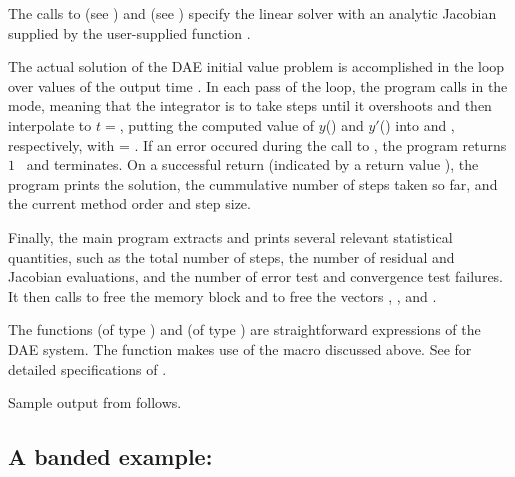 The calls to  (see ) and 
 (see ) specify the {\idadense}
linear solver with an analytic Jacobian supplied by the user-supplied function
.

The actual solution of the DAE initial value problem is accomplished in
the loop over values of the output time .  In each pass of the
loop, the program calls  in the  mode, meaning that
the integrator is to take steps until it overshoots  and then
interpolate to $t =  $, putting the computed value of $y$()
and $y'$() into  and , respectively, with  = . 
If an error occured during the call to , the program returns $1$ \
and terminates.
On a successful return (indicated by a return value ), the program
prints the solution, the cummulative number of steps taken so far, and the 
current method order and step size.

Finally, the main program extracts and prints several relevant statistical quantities,
such as the total number of steps, the number of residual and Jacobian evaluations, and
the number of error test and convergence test failures.
It then calls  to free the {\ida} memory block and  
to free the vectors \id{yy}, \id{yp}, and \id{avtol}. 

The functions  (of type ) and  (of type ) 
are straightforward expressions of the DAE system. 
The function  makes use of the macro  discussed above.
See \ugref{ss:resFn} for detailed specifications of \id{IDAResFn}.

Sample output from  follows.

\subsection{A banded example: }\label{ss:iwebsb}


